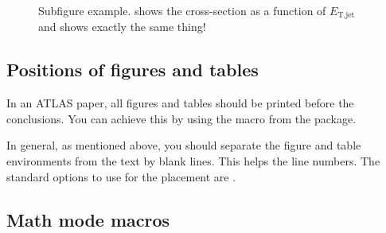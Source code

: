 \begin{figure}[htbp]
  \centering
  \caption{Subfigure example.
    \protect{} shows the cross-section as a function of $E_{\text{T,jet}}$ and 
    \protect{} shows exactly the same thing!}
  \label{fig:subfigexample}
\end{figure}


\subsection{Positions of figures and tables}

In an ATLAS paper, all figures and tables should be printed before the conclusions.
You can achieve this by using the macro  from the
 package.

In general, as mentioned above, you should separate the figure and table environments from the text by blank lines.
This helps the line numbers. The standard options to use for the placement are \Option{[htbp]}.


\subsection{Math mode macros}%
\label{sec:math}

